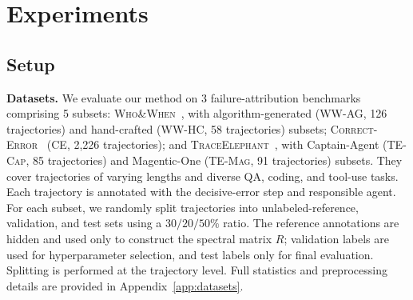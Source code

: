 \section{Experiments}
\label{sec:experiments}





\subsection{Setup}
\label{sec:exp:setup}



\textbf{Datasets.} We evaluate our method \soap on 3 failure-attribution benchmarks comprising 5 subsets:
\textsc{Who\&When}~\citep{whoandwhen}, with algorithm-generated
(\textsc{WW-AG}, 126 trajectories) and hand-crafted
(\textsc{WW-HC}, 58 trajectories) subsets;
\textsc{Correct-Error}~\citep{correct}
(\textsc{CE}, 2{,}226 trajectories);
and \textsc{TraceElephant}~\citep{traceelephant}, with Captain-Agent
(\textsc{TE-Cap}, 85 trajectories) and Magentic-One
(\textsc{TE-Mag}, 91 trajectories) subsets.
They cover trajectories of varying lengths and diverse QA, coding,
and tool-use tasks. Each trajectory is annotated with the decisive-error step
and responsible agent. For each subset, we randomly split trajectories into unlabeled-reference,
validation, and test sets using a $30/20/50\%$ ratio.
The reference annotations are hidden and used only to construct the spectral
matrix $R$; validation labels are used for hyperparameter selection, and test
labels only for final evaluation.
Splitting is performed at the trajectory level.
Full statistics and preprocessing details are provided in
Appendix~\ref{app:datasets}.





